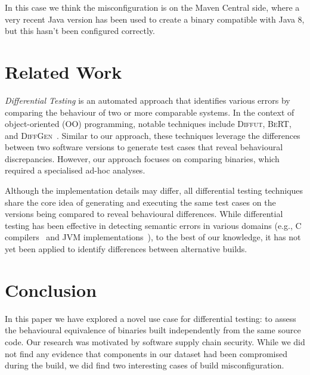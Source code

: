\documentclass[conference]{IEEEtran}
\begin{document}
In this case we think the misconfiguration is on the Maven Central side, where a very recent Java version has been used to create a binary compatible with Java 8, but this hasn't been configured correctly.





\section{Related Work}
\label{sec:relatedwork}

\emph{Differential Testing}\cite{difftesting} is an automated approach that identifies various errors by comparing the behaviour of two or more comparable systems\cite{xie2007towards,jin10:automated,diffgen}. In the context of object-oriented (OO) programming, notable techniques include \textsc{Diffut}\cite{xie2007towards}, \textsc{BeRT}\cite{jin10:automated}, and \textsc{DiffGen}~\cite{diffgen}. Similar to our approach, these techniques leverage the differences between two software versions to generate test cases that reveal behavioural discrepancies. However, our approach focuses on comparing binaries, which required a specialised ad-hoc analyses.

Although the implementation details may differ, all differential testing techniques share the core idea of generating and executing the same test cases on the versions being compared to reveal behavioural differences. %
While differential testing has been effective in detecting semantic errors in various domains (e.g., C compilers~\cite{Yang:compiler:pldi:2011} and JVM implementations~\cite{Chen:jvmdiff:pldi:2016}), to the best of our knowledge, it has not yet been applied to identify differences between alternative builds.


\section{Conclusion}
\label{sec:conclusion}

In this paper we have explored a novel use case for differential testing: to assess the behavioural equivalence of binaries built independently from the same source code. Our research was motivated by software supply chain security. While we did not find any evidence that components in our dataset had been compromised during the build, we did find two interesting cases of build misconfiguration.  
\end{document}
